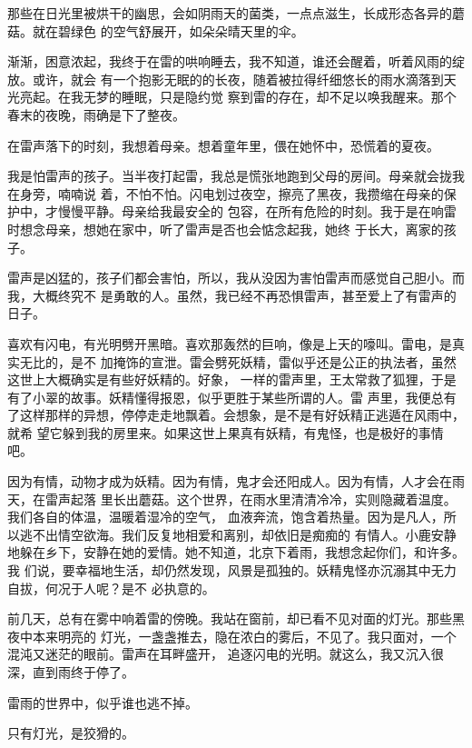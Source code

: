 		那些在日光里被烘干的幽思，会如阴雨天的菌类，一点点滋生，长成形态各异的蘑菇。就在碧绿色
	的空气舒展开，如朵朵晴天里的伞。

		渐渐，困意浓起，我终于在雷的哄响睡去，我不知道，谁还会醒着，听着风雨的绽放。或许，就会
	有一个抱影无眠的的长夜，随着被拉得纤细悠长的雨水滴落到天光亮起。在我无梦的睡眠，只是隐约觉
	察到雷的存在，却不足以唤我醒来。那个春末的夜晚，雨确是下了整夜。

		在雷声落下的时刻，我想着母亲。想着童年里，偎在她怀中，恐慌着的夏夜。

		我是怕雷声的孩子。当半夜打起雷，我总是慌张地跑到父母的房间。母亲就会拢我在身旁，喃喃说
	着，不怕不怕。闪电划过夜空，擦亮了黑夜，我攒缩在母亲的保护中，才慢慢平静。母亲给我最安全的
	包容，在所有危险的时刻。我于是在响雷时想念母亲，想她在家中，听了雷声是否也会惦念起我，她终
	于长大，离家的孩子。

		雷声是凶猛的，孩子们都会害怕，所以，我从没因为害怕雷声而感觉自己胆小。而我，大概终究不
	是勇敢的人。虽然，我已经不再恐惧雷声，甚至爱上了有雷声的日子。

		喜欢有闪电，有光明劈开黑暗。喜欢那轰然的巨响，像是上天的嚎叫。雷电，是真实无比的，是不
	加掩饰的宣泄。雷会劈死妖精，雷似乎还是公正的执法者，虽然这世上大概确实是有些好妖精的。好象，
	一样的雷声里，王太常救了狐狸，于是有了小翠的故事。妖精懂得报恩，似乎更胜于某些所谓的人。雷
	声里，我便总有了这样那样的异想，停停走走地飘着。会想象，是不是有好妖精正逃遁在风雨中，就希
	望它躲到我的房里来。如果这世上果真有妖精，有鬼怪，也是极好的事情吧。

		因为有情，动物才成为妖精。因为有情，鬼才会还阳成人。因为有情，人才会在雨天，在雷声起落
	里长出蘑菇。这个世界，在雨水里清清冷冷，实则隐藏着温度。我们各自的体温，温暖着湿冷的空气，
	血液奔流，饱含着热量。因为是凡人，所以逃不出情空欲海。我们反复地相爱和离别，却依旧是痴痴的
	有情人。小鹿安静地躲在乡下，安静在她的爱情。她不知道，北京下着雨，我想念起你们，和许多。我
	们说，要幸福地生活，却仍然发现，风景是孤独的。妖精鬼怪亦沉溺其中无力自拔，何况于人呢？是不
	必执意的。

		前几天，总有在雾中响着雷的傍晚。我站在窗前，却已看不见对面的灯光。那些黑夜中本来明亮的
	灯光，一盏盏推去，隐在浓白的雾后，不见了。我只面对，一个混沌又迷茫的眼前。雷声在耳畔盛开，
	追逐闪电的光明。就这么，我又沉入很深，直到雨终于停了。

		雷雨的世界中，似乎谁也逃不掉。

		只有灯光，是狡猾的。

	\endwriting



